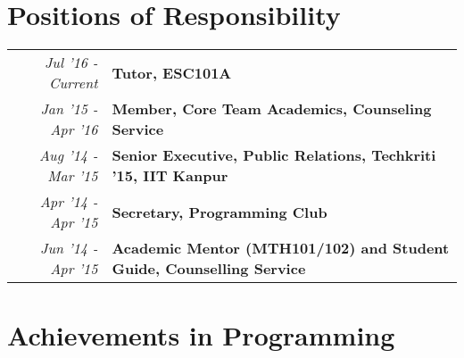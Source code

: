 \documentclass[a4paper]{norm-resume}
\begin{document}
\vspace{0mm}	%


\section{Positions of Responsibility \hrulefill}

\vspace{1mm} %
		
	\begin{tabular}{r|p{16cm}}	

	\null \hspace{10mm} \emph{Jul '16 - Current} & \textbf{Tutor, ESC101A}\\
	
	\emph{Jan '15 - Apr '16} & \textbf{Member, Core Team Academics, Counseling Service}\\

	\emph{Aug '14 - Mar '15} & \textbf{Senior Executive, Public Relations, Techkriti '15, IIT Kanpur}\\

	\emph{Apr '14 - Apr '15} & \textbf{Secretary, Programming Club}\\

	\emph{Jun '14 - Apr '15} & \textbf{Academic Mentor (MTH101/102) and Student Guide, Counselling Service}\\ 

	\end{tabular}


\vspace{1mm}	%



\section{Achievements in Programming \hrulefill}

\vspace{3mm} %
\end{document}
